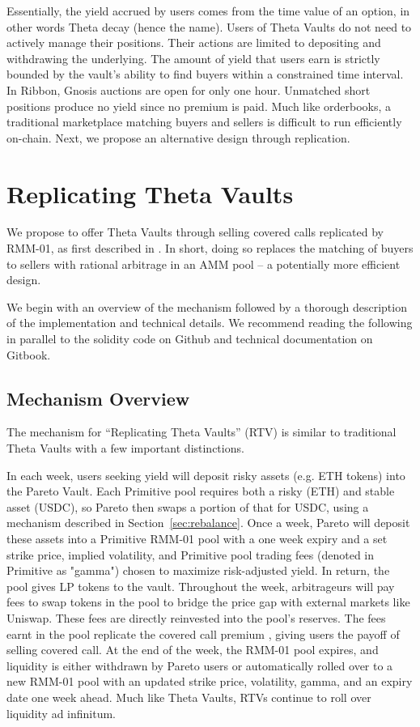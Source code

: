 \documentclass[hidelinks, 12pt]{article}
\begin{document}
Essentially, the yield accrued by users comes from the time value of an option, in other words Theta decay (hence the name). Users of Theta Vaults do not need to actively manage their positions. Their actions are limited to depositing and withdrawing the underlying. The amount of yield that users earn is strictly bounded by the vault's ability to find buyers within a constrained time interval. In Ribbon, Gnosis auctions are open for only one hour. Unmatched short positions produce no yield since no premium is paid. Much like orderbooks, a traditional marketplace matching buyers and sellers is difficult to run efficiently on-chain. Next, we propose an alternative design through replication.

\section{Replicating Theta Vaults}

We propose to offer Theta Vaults through selling covered calls replicated by RMM-01, as first described in \cite{sterrett2022replicating}. In short, doing so replaces the matching of buyers to sellers with rational arbitrage in an AMM pool -- a potentially more efficient design.

We begin with an overview of the mechanism followed by a thorough description of the implementation and technical details. We recommend reading the following in parallel to the solidity code on Github and technical documentation on Gitbook.

\subsection{Mechanism Overview}

The mechanism for ``Replicating Theta Vaults'' (RTV) is similar to traditional Theta Vaults with a few important distinctions.


In each week, users seeking yield will deposit risky assets (e.g. ETH tokens) into the Pareto Vault. Each Primitive pool requires both a risky (ETH) and stable asset (USDC), so Pareto then swaps a portion of that for USDC, using a mechanism described in Section~\ref{sec:rebalance}.  
Once a week, Pareto will deposit these assets into a Primitive RMM-01 pool with a one week expiry and a set strike price, implied volatility, and Primitive pool trading fees (denoted in Primitive as "gamma") chosen to maximize risk-adjusted yield. In return, the pool gives LP tokens to the vault.
Throughout the week, arbitrageurs will pay fees to swap tokens in the pool to bridge the price gap with external markets like Uniswap.
These fees are directly reinvested into the pool's reserves.
The fees earnt in the pool replicate the covered call premium \cite{angeris2021replicating}, giving users the payoff of selling covered call.
At the end of the week, the RMM-01 pool expires, and liquidity is either withdrawn by Pareto users or automatically rolled over to a new RMM-01 pool with an updated strike price, volatility, gamma, and an expiry date one week ahead. Much like Theta Vaults, RTVs continue to roll over liquidity ad infinitum.
\end{document}
